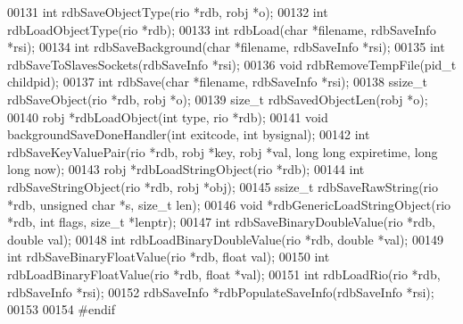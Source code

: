 \begin{DoxyCode}
00131 \textcolor{keywordtype}{int} rdbSaveObjectType(rio *rdb, robj *o);
00132 \textcolor{keywordtype}{int} rdbLoadObjectType(rio *rdb);
00133 \textcolor{keywordtype}{int} rdbLoad(\textcolor{keywordtype}{char} *filename, rdbSaveInfo *rsi);
00134 \textcolor{keywordtype}{int} rdbSaveBackground(\textcolor{keywordtype}{char} *filename, rdbSaveInfo *rsi);
00135 \textcolor{keywordtype}{int} rdbSaveToSlavesSockets(rdbSaveInfo *rsi);
00136 \textcolor{keywordtype}{void} rdbRemoveTempFile(pid\_t childpid);
00137 \textcolor{keywordtype}{int} rdbSave(\textcolor{keywordtype}{char} *filename, rdbSaveInfo *rsi);
00138 ssize\_t rdbSaveObject(rio *rdb, robj *o);
00139 size\_t rdbSavedObjectLen(robj *o);
00140 robj *rdbLoadObject(\textcolor{keywordtype}{int} type, rio *rdb);
00141 \textcolor{keywordtype}{void} backgroundSaveDoneHandler(\textcolor{keywordtype}{int} exitcode, \textcolor{keywordtype}{int} bysignal);
00142 \textcolor{keywordtype}{int} rdbSaveKeyValuePair(rio *rdb, robj *key, robj *val, \textcolor{keywordtype}{long} \textcolor{keywordtype}{long} expiretime, \textcolor{keywordtype}{long} \textcolor{keywordtype}{long} now);
00143 robj *rdbLoadStringObject(rio *rdb);
00144 \textcolor{keywordtype}{int} rdbSaveStringObject(rio *rdb, robj *obj);
00145 ssize\_t rdbSaveRawString(rio *rdb, \textcolor{keywordtype}{unsigned} \textcolor{keywordtype}{char} *s, size\_t len);
00146 \textcolor{keywordtype}{void} *rdbGenericLoadStringObject(rio *rdb, \textcolor{keywordtype}{int} flags, size\_t *lenptr);
00147 \textcolor{keywordtype}{int} rdbSaveBinaryDoubleValue(rio *rdb, \textcolor{keywordtype}{double} val);
00148 \textcolor{keywordtype}{int} rdbLoadBinaryDoubleValue(rio *rdb, \textcolor{keywordtype}{double} *val);
00149 \textcolor{keywordtype}{int} rdbSaveBinaryFloatValue(rio *rdb, \textcolor{keywordtype}{float} val);
00150 \textcolor{keywordtype}{int} rdbLoadBinaryFloatValue(rio *rdb, \textcolor{keywordtype}{float} *val);
00151 \textcolor{keywordtype}{int} rdbLoadRio(rio *rdb, rdbSaveInfo *rsi);
00152 rdbSaveInfo *rdbPopulateSaveInfo(rdbSaveInfo *rsi);
00153 
00154 \textcolor{preprocessor}{#}\textcolor{preprocessor}{endif}
\end{DoxyCode}
